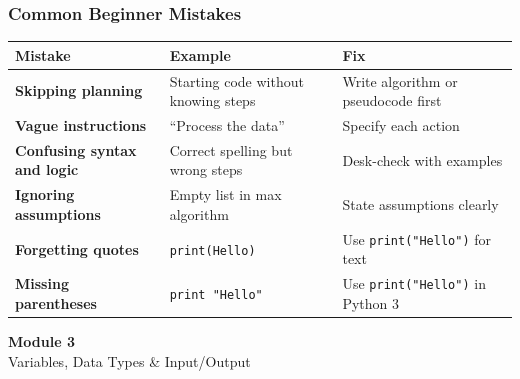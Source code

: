 \documentclass[aspectratio=169,10pt]{beamer}
\begin{document}
\begin{frame}
\frametitle{Common Beginner Mistakes}
\vspace{0.30cm}
\renewcommand{\arraystretch}{1.18}
\begin{tabularx}{\textwidth}{>{\bfseries}p{2.75cm}p{5.65cm}X}
\toprule
Mistake & Example & Fix \\
\midrule
Skipping planning & Starting code without knowing steps & Write algorithm or pseudocode first \\
Vague instructions & ``Process the data'' & Specify each action \\
Confusing syntax and logic & Correct spelling but wrong steps & Desk-check with examples \\
Ignoring assumptions & Empty list in max algorithm & State assumptions clearly \\
Forgetting quotes & \texttt{print(Hello)} & Use \texttt{print("Hello")} for text \\
Missing parentheses & \texttt{print "Hello"} & Use \texttt{print("Hello")} in Python 3 \\
\bottomrule
\end{tabularx}
\end{frame}



\begin{noheadline}
\begin{frame}
\vspace{1.35cm}
\begin{center}
  {\fontsize{30}{36}\selectfont\textbf{Module 3}}\\[0.35cm]
  {\fontsize{25}{30}\selectfont Variables, Data Types \& Input/Output}\\[0.7cm]
\end{center}
\end{frame}
\end{noheadline}
\end{document}
